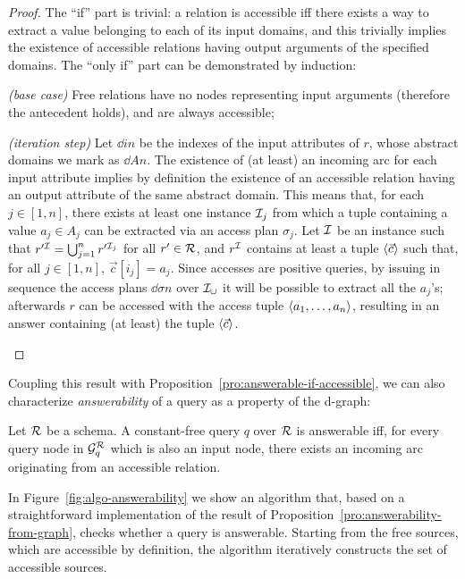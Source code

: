 \begin{proof}
    The ``if'' part is trivial: a relation is accessible iff there exists a way to extract a value belonging to each of its input domains, and this trivially implies the existence of accessible relations having output arguments of the specified domains. The ``only if'' part can be demonstrated by induction:
	\begin{longitem}
	    \item \emph{(base case)} Free relations have no nodes representing input arguments (therefore the antecedent holds), and are always accessible;
	    \item \emph{(iteration step)} Let $\dd{i}{n}$ be the indexes of the input attributes of $r$, whose abstract domains we mark as $\dd{A}{n}$. The existence of (at least) an incoming arc for each input attribute implies by definition the existence of an accessible relation having an output attribute of the same abstract domain.
    This means that, for each $j \in [1, n]$, there exists at least one instance $\mathcal{I}_j$ from which a tuple containing a value $a_j \in A_j$ can be extracted via an access plan $\sigma_j$. Let $\mathcal{I}$ be an instance such that $r'^{\mathcal{I}} = \bigcup_{j = 1}^n r'^{\mathcal{I}_j}$ for all $r' \in \mathcal{R}$, and $r^{\mathcal{I}}$ contains at least a tuple $\langle \vec c\rangle$ such that, for all $j \in [1, n]$, $\vec c[i_j] = a_j$. Since accesses are positive queries, by issuing in sequence the access plans $\dd{\sigma}{n}$ over $\mathcal{I}_\cup$ it will be possible to extract all the $a_j$'s; afterwards $r$ can be accessed with the access tuple $\langle a_1,\ldots,a_{n}\rangle$, resulting in an answer containing (at least) the tuple $\langle \vec c\rangle$.
	\end{longitem}
\end{proof}
%
Coupling this result with Proposition~\ref{pro:answerable-if-accessible}, we can also characterize \emph{answerability} of a query as a property of the d-graph:
%
\begin{proposition}\label{pro:answerability-from-graph}
    Let $\mathcal{R}$ be a schema. A constant-free query $q$ over $\mathcal{R}$ is answerable iff, for every query node in $\mathcal{G}_q^{\mathcal{R}}$ which is also an input node, there exists an incoming arc originating from an accessible relation.
\end{proposition}
In Figure~\ref{fig:algo-answerability} we show an algorithm that, based on a straightforward implementation of the result of Proposition~\ref{pro:answerability-from-graph}, checks whether a query is answerable. Starting from the free sources, which are accessible by definition, the algorithm iteratively constructs the set of accessible sources.

